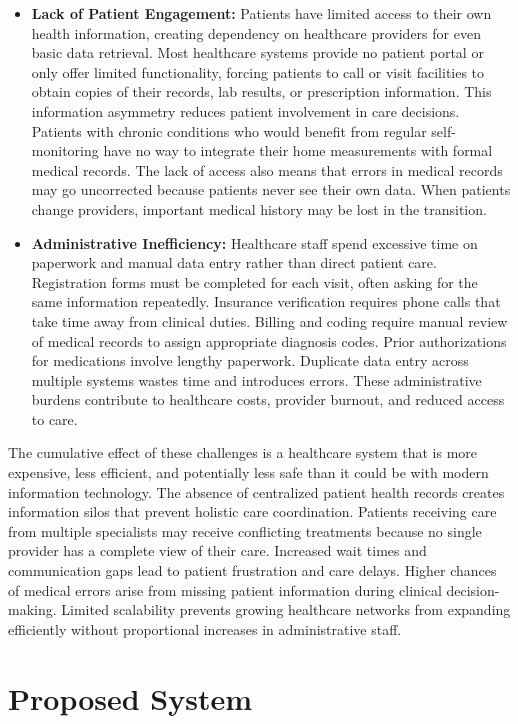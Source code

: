 \begin{itemize}
    \item \textbf{Lack of Patient Engagement:} Patients have limited access to their own health information, creating dependency on healthcare providers for even basic data retrieval. Most healthcare systems provide no patient portal or only offer limited functionality, forcing patients to call or visit facilities to obtain copies of their records, lab results, or prescription information. This information asymmetry reduces patient involvement in care decisions. Patients with chronic conditions who would benefit from regular self-monitoring have no way to integrate their home measurements with formal medical records. The lack of access also means that errors in medical records may go uncorrected because patients never see their own data. When patients change providers, important medical history may be lost in the transition.

    \item \textbf{Administrative Inefficiency:} Healthcare staff spend excessive time on paperwork and manual data entry rather than direct patient care. Registration forms must be completed for each visit, often asking for the same information repeatedly. Insurance verification requires phone calls that take time away from clinical duties. Billing and coding require manual review of medical records to assign appropriate diagnosis codes. Prior authorizations for medications involve lengthy paperwork. Duplicate data entry across multiple systems wastes time and introduces errors. These administrative burdens contribute to healthcare costs, provider burnout, and reduced access to care.
\end{itemize}

\justifying
\noindent The cumulative effect of these challenges is a healthcare system that is more expensive, less efficient, and potentially less safe than it could be with modern information technology. The absence of centralized patient health records creates information silos that prevent holistic care coordination. Patients receiving care from multiple specialists may receive conflicting treatments because no single provider has a complete view of their care. Increased wait times and communication gaps lead to patient frustration and care delays. Higher chances of medical errors arise from missing patient information during clinical decision-making. Limited scalability prevents growing healthcare networks from expanding efficiently without proportional increases in administrative staff.

\section{Proposed System}

